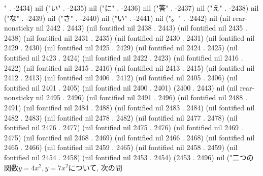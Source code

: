" . -2434) nil ("い" . -2435) nil ("に" . -2436) nil ("答" . -2437) nil ("え" . -2438) nil ("な" . -2439) nil ("さ" . -2440) nil ("い" . -2441) nil ("。" . -2442) nil (nil rear-nonsticky nil 2442 . 2443) (nil fontified nil 2438 . 2443) (nil fontified nil 2435 . 2438) (nil fontified nil 2431 . 2435) (nil fontified nil 2430 . 2431) (nil fontified nil 2429 . 2430) (nil fontified nil 2425 . 2429) (nil fontified nil 2424 . 2425) (nil fontified nil 2423 . 2424) (nil fontified nil 2422 . 2423) (nil fontified nil 2416 . 2422) (nil fontified nil 2415 . 2416) (nil fontified nil 2413 . 2415) (nil fontified nil 2412 . 2413) (nil fontified nil 2406 . 2412) (nil fontified nil 2405 . 2406) (nil fontified nil 2401 . 2405) (nil fontified nil 2400 . 2401) (2400 . 2443) nil (nil rear-nonsticky nil 2495 . 2496) (nil fontified nil 2491 . 2496) (nil fontified nil 2488 . 2491) (nil fontified nil 2484 . 2488) (nil fontified nil 2483 . 2484) (nil fontified nil 2482 . 2483) (nil fontified nil 2478 . 2482) (nil fontified nil 2477 . 2478) (nil fontified nil 2476 . 2477) (nil fontified nil 2475 . 2476) (nil fontified nil 2469 . 2475) (nil fontified nil 2468 . 2469) (nil fontified nil 2466 . 2468) (nil fontified nil 2465 . 2466) (nil fontified nil 2459 . 2465) (nil fontified nil 2458 . 2459) (nil fontified nil 2454 . 2458) (nil fontified nil 2453 . 2454) (2453 . 2496) nil ("二つの関数$y=4x^{2}, y=7x^{2}$について, 次の問

